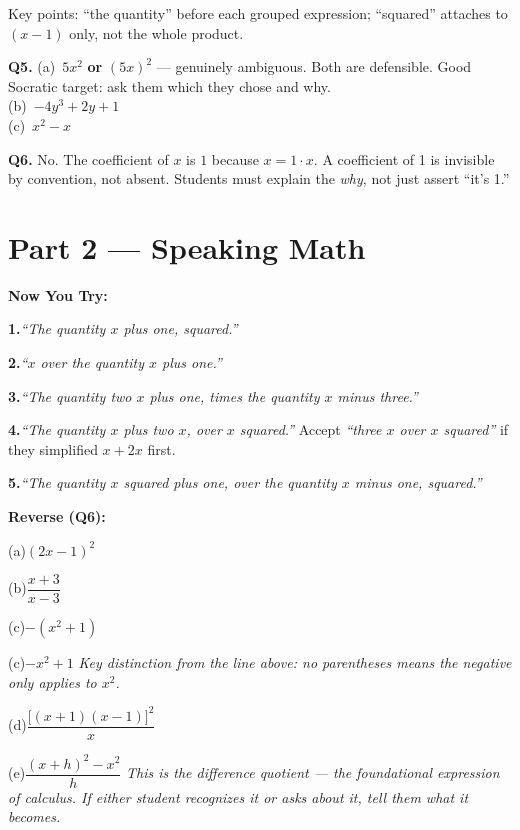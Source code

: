 \documentclass[12pt]{article}
\begin{document}
Key points: ``the quantity'' before each grouped expression; ``squared'' attaches to $(x-1)$ only, not the whole product.

\medskip
\textbf{Q5.}\quad
(a)~$5x^2$ \textbf{or} $(5x)^2$ --- genuinely ambiguous. Both are defensible.
Good Socratic target: ask them which they chose and why.\\
(b)~$-4y^3 + 2y + 1$\\
(c)~$x^2 - x$

\medskip
\textbf{Q6.}\quad
No. The coefficient of $x$ is $1$ because $x = 1 \cdot x$.
A coefficient of 1 is invisible by convention, not absent.
Students must explain the \textit{why}, not just assert ``it's 1.''

\section*{Part 2 --- Speaking Math}

\textbf{Now You Try:}

\textbf{1.}\quad \textit{``The quantity $x$ plus one, squared.''}

\textbf{2.}\quad \textit{``$x$ over the quantity $x$ plus one.''}

\textbf{3.}\quad \textit{``The quantity two $x$ plus one, times the quantity $x$ minus three.''}

\textbf{4.}\quad \textit{``The quantity $x$ plus two $x$, over $x$ squared.''}
Accept \textit{``three $x$ over $x$ squared''} if they simplified $x + 2x$ first.

\textbf{5.}\quad \textit{``The quantity $x$ squared plus one, over the quantity $x$ minus one, squared.''}

\medskip
\textbf{Reverse (Q6):}

(a)\quad $(2x-1)^2$

(b)\quad $\dfrac{x+3}{x-3}$

(c)\quad $-(x^2+1)$

(c)\quad $-x^2 + 1$\quad
\textit{Key distinction from the line above: no parentheses means the negative only applies to $x^2$.}

(d)\quad $\dfrac{\bigl[(x+1)(x-1)\bigr]^2}{x}$

(e)\quad $\dfrac{(x+h)^2 - x^2}{h}$\quad
\textit{This is the difference quotient --- the foundational expression of calculus.
If either student recognizes it or asks about it, tell them what it becomes.}

\end{document}
